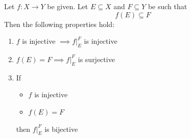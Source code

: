 \bigskip

\begin{theorem} \label{an:thm:properties-of-restriction-functions}
    Let $f: X \to Y$ be given. Let $E \subseteq X$ and $F \subseteq Y$ be such that
    \[
    f(E) \subseteq F
    \]
    Then the following properties hold:
    \begin{enumerate}[label=\textbf{(\Alph*)}]
        \item $f$ is injective $\implies f|_{E}^{F}$ is injective
        \item $f(E) = F \implies f|_{E}^{F}$ is surjective
        \item If
        \begin{itemize}
            \item $f$ is injective
            \item $f(E) = F$
        \end{itemize}
        then $f|_{E}^{F}$ is bijective
    \end{enumerate}
\end{theorem}
